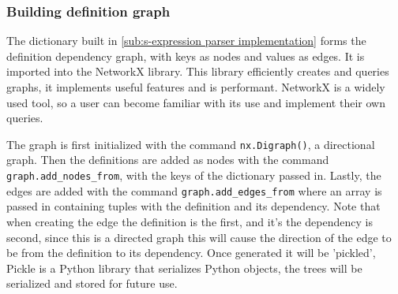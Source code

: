 
\subsubsection{Building definition graph}

The dictionary built in \cref{sub:s-expression parser implementation} forms the
definition dependency graph, with keys as nodes and values as edges. It is
imported into the NetworkX library. This library efficiently creates and
queries graphs, it implements useful features and is performant. NetworkX is a
widely used tool, so a user can become familiar with its use and
implement their own queries. 

 The graph is
first initialized with the command \texttt{nx.Digraph()}, a directional graph.
Then the definitions are added as nodes with the command
\texttt{graph.add\_nodes\_from}, with the keys of the dictionary passed in.
Lastly, the edges are added with the command \texttt{graph.add\_edges\_from}
where an array is passed in containing tuples with the definition and its
dependency. Note that when creating the edge the definition is the first, and
it's the dependency is second, since this is a directed graph this will cause
the direction of the edge to be from the definition to its dependency.  Once
generated it will be 'pickled', Pickle is a Python library that serializes Python
objects, the trees will be serialized and stored for future use. 

